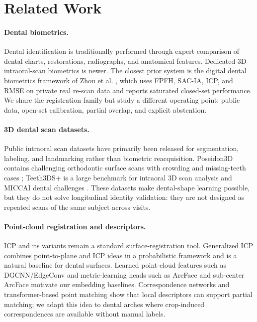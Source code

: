 \documentclass[10pt,twocolumn]{article}
\begin{document}
\section{Related Work}
\paragraph{Dental biometrics.}
Dental identification is traditionally performed through expert comparison of dental charts, restorations, radiographs, and anatomical features. Dedicated 3D intraoral-scan biometrics is newer. The closest prior system is the digital dental biometrics framework of Zhou et al. \citep{zhou2024dentalbiometrics}, which uses FPFH, SAC-IA, ICP, and RMSE on private real re-scan data and reports saturated closed-set performance. We share the registration family but study a different operating point: public data, open-set calibration, partial overlap, and explicit abstention.

\paragraph{3D dental scan datasets.}
Public intraoral scan datasets have primarily been released for segmentation, labeling, and landmarking rather than biometric reacquisition. Poseidon3D contains challenging orthodontic surface scans with crowding and missing-teeth cases \citep{kubik2024poseidon}; Teeth3DS+ is a large benchmark for intraoral 3D scan analysis and MICCAI dental challenges \citep{ben2022teeth3ds}. These datasets make dental-shape learning possible, but they do not solve longitudinal identity validation: they are not designed as repeated scans of the same subject across visits.

\paragraph{Point-cloud registration and descriptors.}
ICP and its variants remain a standard surface-registration tool. Generalized ICP \citep{segal2009gicp} combines point-to-plane and ICP ideas in a probabilistic framework and is a natural baseline for dental surfaces. Learned point-cloud features such as DGCNN/EdgeConv \citep{wang2019dgcnn} and metric-learning heads such as ArcFace and sub-center ArcFace \citep{deng2019arcface,deng2020subcenter} motivate our embedding baselines. Correspondence networks and transformer-based point matching \citep{qin2022geotransformer} show that local descriptors can support partial matching; we adapt this idea to dental arches where crop-induced correspondences are available without manual labels.
\end{document}
